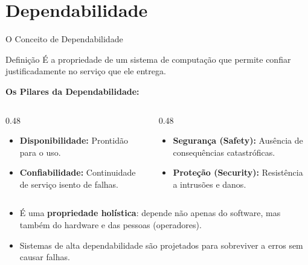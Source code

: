 \documentclass[9pt]{beamer}
\begin{document}
\section{Dependabilidade}  

\begin{frame}{O Conceito de Dependabilidade}
    \begin{block}{Definição}
        É a propriedade de um sistema de computação que permite confiar justificadamente no serviço que ele entrega.
    \end{block}

    \textbf{Os Pilares da Dependabilidade:}
    \begin{columns}[T]
        \begin{column}{0.48\textwidth}
            \begin{itemize}
                \item \textbf{Disponibilidade:} Prontidão para o uso.
                \item \textbf{Confiabilidade:} Continuidade de serviço isento de falhas.
            \end{itemize}
        \end{column}
        \begin{column}{0.48\textwidth}
            \begin{itemize}
                \item \textbf{Segurança (Safety):} Ausência de consequências catastróficas.
                \item \textbf{Proteção (Security):} Resistência a intrusões e danos.
            \end{itemize}
        \end{column}
    \end{columns}

    \vspace{0.4cm}
    

    \begin{itemize}
        \item É uma \textbf{propriedade holística}: depende não apenas do software, mas também do hardware e das pessoas (operadores).
        \item Sistemas de alta dependabilidade são projetados para sobreviver a erros sem causar falhas.
    \end{itemize}
\end{frame}
\end{document}
